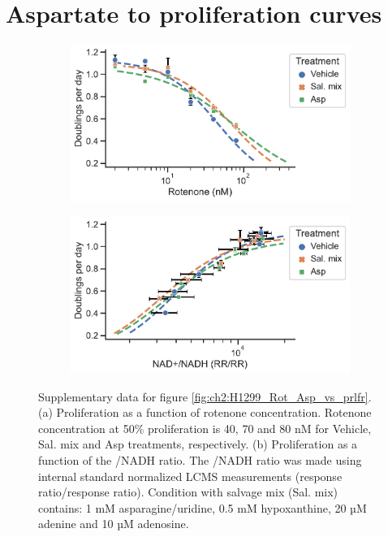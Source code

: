 \section{Aspartate to proliferation curves}
\label{sec:ch2:app:asp_prlfr}
\begin{figure}[ht]
     \centering
     \begin{subfigure}[b]{0.49\textwidth}
         \includegraphics[width=\textwidth]{figures/chap2/app/H1299_Rot_Rot_vs_prlfr_noPyr.pdf}
         \caption{}
         \label{fig:app_ch2:H1299_Rot_Rot_vs_prlfr}
     \end{subfigure}
     \hfill
     \begin{subfigure}[b]{0.49\textwidth}
         \includegraphics[width=\textwidth]{figures/chap2/app/H1299_Rot_NAD_vs_prlfr_noPyr.pdf}
         \caption{}
         \label{fig:app_ch2:H1299_Rot_NAD_vs_prlfr}
     \end{subfigure}
        \caption[H1299 rotenone titration aspartate to proliferation.]{
        Supplementary data for figure \ref{fig:ch2:H1299_Rot_Asp_vs_prlfr}.
        (a) Proliferation as a function of rotenone concentration.
        Rotenone concentration at 50\% proliferation is 40, 70 and 80 nM for Vehicle, Sal. mix and Asp treatments, respectively.
        (b) Proliferation as a function of the \NAD{}/NADH ratio.
        The \NAD{}/NADH ratio was made using internal standard normalized LCMS measurements (response ratio/response ratio).
        Condition with salvage mix (Sal. mix) contains: 1 mM asparagine/uridine, 0.5 mM hypoxanthine, 20 µM adenine and 10 µM adenosine.
        }
        \label{fig:app_ch2:H1299_Rot_RotNAD_vs_prlfr}
\end{figure}


